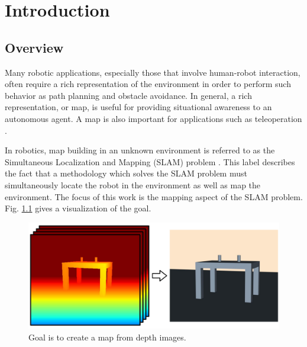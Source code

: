 
\chapter{Introduction} \label{chapter:introduction}
\section{Overview}


Many robotic applications, especially those that involve human-robot
interaction, often require a rich representation of the environment in order to
perform such behavior as path planning and obstacle avoidance. In general, a
rich representation, or map, is useful for providing situational awareness to an
autonomous agent. A map is also important for applications such as teleoperation
\cite{Kadous2006}.

In robotics, map building in an unknown environment is referred to as the
Simultaneous Localization and Mapping (SLAM) problem \cite{Thrun2002}. This
label describes the fact that a methodology which solves the SLAM problem must
simultaneously locate the robot in the environment as well as map the
environment. The focus of this work is the mapping aspect of the SLAM problem.
Fig. \ref{fig:goal} gives a visualization of the goal.

\begin{figure}[h]%
\centering
  \includegraphics[width=.75\textwidth]{figures/intro_goal.pdf}
  \caption{Goal is to create a map from depth images.}
  \label{fig:goal}
\end{figure}

